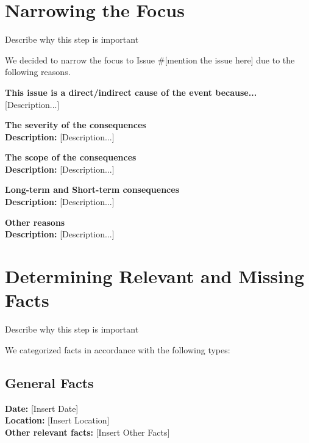 \documentclass[12pt,a4paper]{article}
\begin{document}
\section{Narrowing the Focus}
\vspace{0.3cm}
\noindent Describe why this step is important 
\vspace{0.3cm}

\noindent We decided to narrow the focus to Issue \#[mention the issue here] due to the following reasons.

\vspace{0.3cm}
\noindent\textbf{This issue is a direct/indirect cause of the event because...} [Description...]

\vspace{0.3cm}
\noindent\textbf{The severity of the consequences}\\
\textbf{Description:} [Description...]

\vspace{0.3cm}
\noindent\textbf{The scope of the consequences}\\
\textbf{Description:} [Description...]

\vspace{0.3cm}
\noindent\textbf{Long-term and Short-term consequences}\\
\textbf{Description:} [Description...]

\vspace{0.3cm}
\noindent\textbf{Other reasons}\\
\textbf{Description:} [Description...]

\section{Determining Relevant and Missing Facts}
\vspace{0.3cm}
\noindent Describe why this step is important 

\vspace{0.3cm}
\noindent We categorized facts in accordance with the following types:

\subsection{General Facts}
\noindent\textbf{Date: } [Insert Date]\\
\textbf{Location: } [Insert Location]\\
\textbf{Other relevant facts: } [Insert Other Facts]
\end{document}
